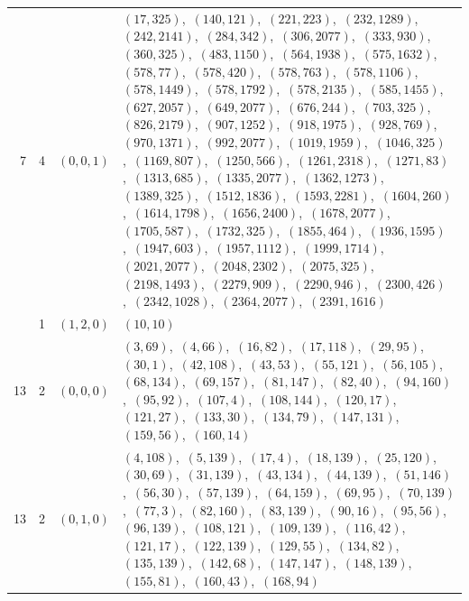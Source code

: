 \documentclass[11pt]{article}
\begin{document}
\begin{longtable}{@{}rrl>{\raggedright\arraybackslash}p{}@{}}
7 & 4 & $(0,0,1)$ & $(17,325)$,\allowbreak\ $(140,121)$,\allowbreak\ $(221,223)$,\allowbreak\ $(232,1289)$,\allowbreak\ $(242,2141)$,\allowbreak\ $(284,342)$,\allowbreak\ $(306,2077)$,\allowbreak\ $(333,930)$,\allowbreak\ $(360,325)$,\allowbreak\ $(483,1150)$,\allowbreak\ $(564,1938)$,\allowbreak\ $(575,1632)$,\allowbreak\ $(578,77)$,\allowbreak\ $(578,420)$,\allowbreak\ $(578,763)$,\allowbreak\ $(578,1106)$,\allowbreak\ $(578,1449)$,\allowbreak\ $(578,1792)$,\allowbreak\ $(578,2135)$,\allowbreak\ $(585,1455)$,\allowbreak\ $(627,2057)$,\allowbreak\ $(649,2077)$,\allowbreak\ $(676,244)$,\allowbreak\ $(703,325)$,\allowbreak\ $(826,2179)$,\allowbreak\ $(907,1252)$,\allowbreak\ $(918,1975)$,\allowbreak\ $(928,769)$,\allowbreak\ $(970,1371)$,\allowbreak\ $(992,2077)$,\allowbreak\ $(1019,1959)$,\allowbreak\ $(1046,325)$,\allowbreak\ $(1169,807)$,\allowbreak\ $(1250,566)$,\allowbreak\ $(1261,2318)$,\allowbreak\ $(1271,83)$,\allowbreak\ $(1313,685)$,\allowbreak\ $(1335,2077)$,\allowbreak\ $(1362,1273)$,\allowbreak\ $(1389,325)$,\allowbreak\ $(1512,1836)$,\allowbreak\ $(1593,2281)$,\allowbreak\ $(1604,260)$,\allowbreak\ $(1614,1798)$,\allowbreak\ $(1656,2400)$,\allowbreak\ $(1678,2077)$,\allowbreak\ $(1705,587)$,\allowbreak\ $(1732,325)$,\allowbreak\ $(1855,464)$,\allowbreak\ $(1936,1595)$,\allowbreak\ $(1947,603)$,\allowbreak\ $(1957,1112)$,\allowbreak\ $(1999,1714)$,\allowbreak\ $(2021,2077)$,\allowbreak\ $(2048,2302)$,\allowbreak\ $(2075,325)$,\allowbreak\ $(2198,1493)$,\allowbreak\ $(2279,909)$,\allowbreak\ $(2290,946)$,\allowbreak\ $(2300,426)$,\allowbreak\ $(2342,1028)$,\allowbreak\ $(2364,2077)$,\allowbreak\ $(2391,1616)$\\
\addlinespace[3pt]
13 & 1 & $(1,2,0)$ & $(10,10)$\\
13 & 2 & $(0,0,0)$ & $(3,69)$,\allowbreak\ $(4,66)$,\allowbreak\ $(16,82)$,\allowbreak\ $(17,118)$,\allowbreak\ $(29,95)$,\allowbreak\ $(30,1)$,\allowbreak\ $(42,108)$,\allowbreak\ $(43,53)$,\allowbreak\ $(55,121)$,\allowbreak\ $(56,105)$,\allowbreak\ $(68,134)$,\allowbreak\ $(69,157)$,\allowbreak\ $(81,147)$,\allowbreak\ $(82,40)$,\allowbreak\ $(94,160)$,\allowbreak\ $(95,92)$,\allowbreak\ $(107,4)$,\allowbreak\ $(108,144)$,\allowbreak\ $(120,17)$,\allowbreak\ $(121,27)$,\allowbreak\ $(133,30)$,\allowbreak\ $(134,79)$,\allowbreak\ $(147,131)$,\allowbreak\ $(159,56)$,\allowbreak\ $(160,14)$\\
13 & 2 & $(0,1,0)$ & $(4,108)$,\allowbreak\ $(5,139)$,\allowbreak\ $(17,4)$,\allowbreak\ $(18,139)$,\allowbreak\ $(25,120)$,\allowbreak\ $(30,69)$,\allowbreak\ $(31,139)$,\allowbreak\ $(43,134)$,\allowbreak\ $(44,139)$,\allowbreak\ $(51,146)$,\allowbreak\ $(56,30)$,\allowbreak\ $(57,139)$,\allowbreak\ $(64,159)$,\allowbreak\ $(69,95)$,\allowbreak\ $(70,139)$,\allowbreak\ $(77,3)$,\allowbreak\ $(82,160)$,\allowbreak\ $(83,139)$,\allowbreak\ $(90,16)$,\allowbreak\ $(95,56)$,\allowbreak\ $(96,139)$,\allowbreak\ $(108,121)$,\allowbreak\ $(109,139)$,\allowbreak\ $(116,42)$,\allowbreak\ $(121,17)$,\allowbreak\ $(122,139)$,\allowbreak\ $(129,55)$,\allowbreak\ $(134,82)$,\allowbreak\ $(135,139)$,\allowbreak\ $(142,68)$,\allowbreak\ $(147,147)$,\allowbreak\ $(148,139)$,\allowbreak\ $(155,81)$,\allowbreak\ $(160,43)$,\allowbreak\ $(168,94)$\\

\end{longtable}
\end{document}
